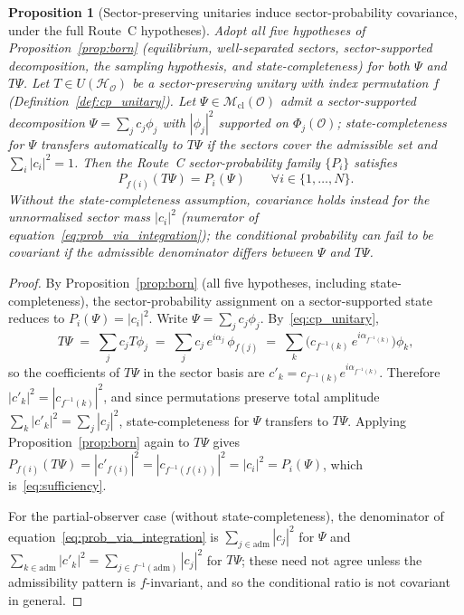 \documentclass[12pt]{article}
\newtheorem{proposition}[theorem]{Proposition}
\newcommand{\Ocal}{\mathcal{O}}
\newcommand{\Hcal}{\mathcal{H}}
\newcommand{\Mcl}{\mathcal{M}_{\mathrm{cl}}}
\begin{document}
\begin{proposition}[Sector-preserving unitaries induce sector-probability covariance, under the full Route~C hypotheses]\label{prop:suff}
Adopt all five hypotheses of Proposition~\ref{prop:born} (equilibrium, well-separated sectors, sector-supported decomposition, the sampling hypothesis, and state-completeness) for both $\Psi$ and $T\Psi$. Let $T \in U(\Hcal_\Ocal)$ be a sector-preserving unitary with index permutation $f$ (Definition~\ref{def:cp_unitary}). Let $\Psi \in \Mcl(\Ocal)$ admit a sector-supported decomposition $\Psi = \sum_j c_j \phi_j$ with $|\phi_j|^2$ supported on $\Phi_j(\Ocal)$; state-completeness for $\Psi$ transfers automatically to $T\Psi$ if the sectors cover the admissible set and $\sum_i|c_i|^2 = 1$. Then the Route~C sector-probability family $\{P_i\}$ satisfies
\begin{equation}\label{eq:sufficiency}
    P_{f(i)}(T\Psi) = P_i(\Psi) \qquad \forall i \in \{1, \ldots, N\}.
\end{equation}
Without the state-completeness assumption, covariance holds instead for the unnormalised sector mass $|c_i|^2$ (numerator of equation~\eqref{eq:prob_via_integration}); the conditional probability can fail to be covariant if the admissible denominator differs between $\Psi$ and $T\Psi$.
\end{proposition}

\begin{proof}
By Proposition~\ref{prop:born} (all five hypotheses, including state-completeness), the sector-probability assignment on a sector-supported state reduces to $P_i(\Psi) = |c_i|^2$. Write $\Psi = \sum_j c_j \phi_j$. By~\eqref{eq:cp_unitary},
\begin{equation}
    T\Psi \;=\; \sum_j c_j T\phi_j \;=\; \sum_j c_j\, e^{i\alpha_j}\, \phi_{f(j)} \;=\; \sum_k \bigl(c_{f^{-1}(k)}\, e^{i\alpha_{f^{-1}(k)}}\bigr) \phi_k,
\end{equation}
so the coefficients of $T\Psi$ in the sector basis are $c'_k = c_{f^{-1}(k)} e^{i\alpha_{f^{-1}(k)}}$. Therefore $|c'_k|^2 = |c_{f^{-1}(k)}|^2$, and since permutations preserve total amplitude $\sum_k |c'_k|^2 = \sum_j |c_j|^2$, state-completeness for $\Psi$ transfers to $T\Psi$. Applying Proposition~\ref{prop:born} again to $T\Psi$ gives $P_{f(i)}(T\Psi) = |c'_{f(i)}|^2 = |c_{f^{-1}(f(i))}|^2 = |c_i|^2 = P_i(\Psi)$, which is~\eqref{eq:sufficiency}.

For the partial-observer case (without state-completeness), the denominator of equation~\eqref{eq:prob_via_integration} is $\sum_{j\in\mathrm{adm}}|c_j|^2$ for $\Psi$ and $\sum_{k\in\mathrm{adm}}|c'_k|^2 = \sum_{j\in f^{-1}(\mathrm{adm})}|c_j|^2$ for $T\Psi$; these need not agree unless the admissibility pattern is $f$-invariant, and so the conditional ratio is not covariant in general.
\end{proof}
\end{document}

